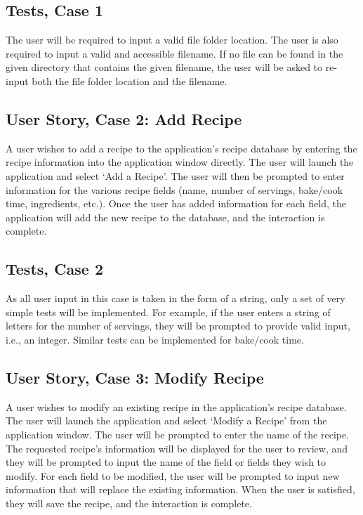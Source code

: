 \documentclass[landscape]{article}
\begin{document}
\subsection{Tests, Case 1}

The user will be required to input a valid file folder location. The user is also required to input a valid and accessible filename. If no file can be found in the given directory that contains the given filename, the user will be asked to re-input both the file folder location and the filename.

\subsection{User Story, Case 2: Add Recipe}

A user wishes to add a recipe to the application's recipe database by entering the recipe information into the application window directly. The user will launch the application and select `Add a Recipe'. The user will then be prompted to enter information for the various recipe fields (name, number of servings, bake/cook time, ingredients, etc.). Once the user has added information for each field, the application will add the new recipe to the database, and the interaction is complete.

\subsection{Tests, Case 2}

As all user input in this case is taken in the form of a string, only a set of very simple tests will be implemented. For example, if the user enters a string of letters for the number of servings, they will be prompted to provide valid input, i.e., an integer. Similar tests can be implemented for bake/cook time.

\subsection{User Story, Case 3: Modify Recipe}

A user wishes to modify an existing recipe in the application's recipe database. The user will launch the application and select `Modify a Recipe' from the application window. The user will be prompted to enter the name of the recipe. The requested recipe's information will be displayed for the user to review, and they will be prompted to input the name of the field or fields they wish to modify. For each field to be modified, the user will be prompted to input new information that will replace the existing information. When the user is satisfied, they will save the recipe, and the interaction is complete.
\end{document}
